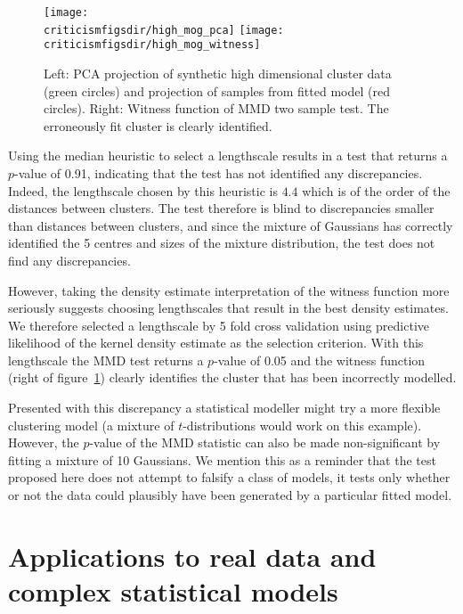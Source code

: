\begin{figure}[ht]
\centering
\texttt{[image: \\criticismfigsdir/high\_mog\_pca]}
\hspace{0.1\columnwidth}
\texttt{[image: \\criticismfigsdir/high\_mog\_witness]}
\caption[PCA projection of cluster data and witness function.]{
Left: PCA projection of synthetic high dimensional cluster data (green circles) and projection of samples from fitted model (red circles).
Right: Witness function of MMD two sample test. The erroneously fit cluster is clearly identified.
}
\label{fig:high_mog}
\end{figure}

Using the median heuristic to select a lengthscale results in a test that returns a $p$-value of 0.91, indicating that the test has not identified any discrepancies.
Indeed, the lengthscale chosen by this heuristic is $4.4$ which is of the order of the distances between clusters.
The test therefore is blind to discrepancies smaller than distances between clusters\footnotemark, and since the mixture of Gaussians has correctly identified the 5 centres and sizes of the mixture distribution, the test does not find any discrepancies.

However, taking the density estimate interpretation of the witness function more seriously suggests choosing lengthscales that result in the best density estimates.
We therefore selected a lengthscale by 5 fold cross validation using predictive likelihood of the kernel density estimate as the selection criterion.
With this lengthscale the MMD test returns a $p$-value of 0.05 and the witness function (right of figure~\ref{fig:high_mog}) clearly identifies the cluster that has been incorrectly modelled.

Presented with this discrepancy a statistical modeller might try a more flexible clustering model \citep[e.g.][]{Peel2000-pv, Iwata2013-yj} (a mixture of $t$-distributions would work on this example).
However, the $p$-value of the MMD statistic can also be made non-significant by fitting a mixture of 10 Gaussians.
We mention this as a reminder that the test proposed here does not attempt to falsify a class of models, it tests only whether or not the data could plausibly have been generated by a particular fitted model.

\section{Applications to real data and complex statistical models}

